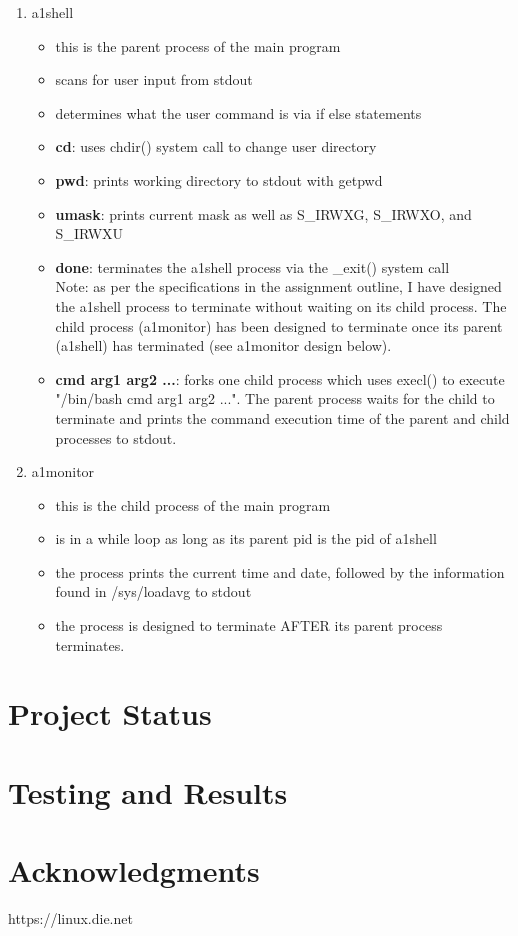 \documentclass{article}
\begin{document}
\begin{enumerate}
   \item a1shell
   \begin{itemize}
     \item this is the parent process of the main program
     \item scans for user input from stdout
     \item determines what the user command is via if else statements
     \item \textbf{cd}: uses chdir() system call to change user directory
     \item \textbf{pwd}: prints working directory to stdout with getpwd
     \item \textbf{umask}: prints current mask as well as S_IRWXG, S_IRWXO, and S_IRWXU
     \item \textbf{done}: terminates the a1shell process via the _exit() system call \\
     Note: as per the specifications in the assignment outline, I have designed the a1shell
     process to terminate without waiting on its child process. The child process (a1monitor) has
     been designed to terminate once its parent (a1shell) has terminated (see a1monitor design
     below).
     \item \textbf{cmd arg1 arg2 ...}: forks one child process which uses execl() to execute
     "/bin/bash cmd arg1 arg2 ...". The parent process waits for the child to terminate and
     prints the command execution time of the parent and child processes to stdout.
   \end{itemize}
   \item a1monitor
   \begin{itemize}
     \item this is the child process of the main program
     \item is in a while loop as long as its parent pid is the pid of a1shell
     \item the process prints the current time and date, followed by the information found
     in /sys/loadavg to stdout
     \item the process is designed to terminate AFTER its parent process terminates.
   \end{itemize}
\end{enumerate}

\section{Project Status}

\section{Testing and Results}

\section{Acknowledgments}
https://linux.die.net
\end{document}
